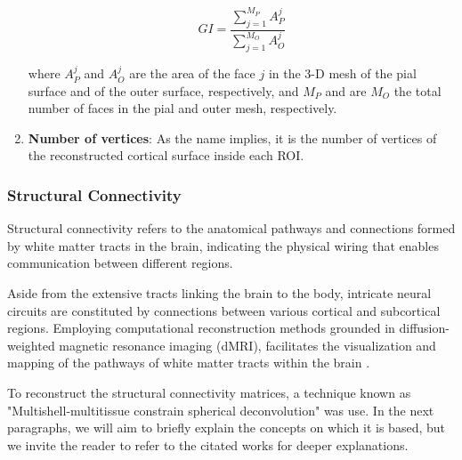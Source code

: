 \documentclass{cys}
\begin{document}
\begin{enumerate}
\begin{equation}
GI=\frac{\sum_{j=1}^{M_P}A_P^j}{\sum_{j=1}^{M_O}A_O^j}
\end{equation}

where $A_P^j$ and $A_O^j$ are the area of the face $j$ in the 3-D mesh
of the pial surface and of the outer surface, respectively, and $M_P$ and are $M_O$ the total number of faces in the pial and outer mesh, respectively.
\\
\item \textbf{Number of vertices}: As the name implies, it is the number of vertices of the reconstructed cortical surface inside each ROI.


\end{enumerate}

\bigskip

\bigskip

\subsubsection{Structural Connectivity}

Structural connectivity refers to the anatomical pathways and connections formed by white matter tracts in the brain, indicating the physical wiring that enables communication between different regions.

\bigskip
Aside from the extensive tracts linking the brain to the body, intricate neural circuits are constituted by connections between various cortical and subcortical regions. Employing computational reconstruction methods grounded in diffusion-weighted magnetic resonance imaging (dMRI), facilitates the visualization and mapping of the pathways of white matter tracts within the brain \cite{maier2017challenge}.

\bigskip
To reconstruct the structural connectivity matrices, a technique known as "Multishell-multitissue constrain spherical deconvolution" was use. In the next paragraphs, we will aim to briefly explain the concepts on which it is based, but we invite the reader to refer to the citated works for deeper explanations.
\end{document}
